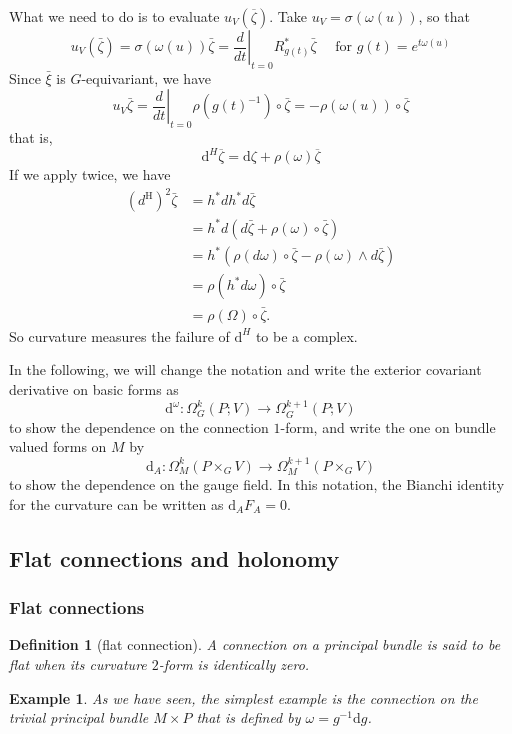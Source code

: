 \documentclass[11pt]{amsart}
\numberwithin{equation}{section}
\theoremstyle{plain}
\theoremstyle{plain}
\newtheorem{defnsub}[thmsub]{Definition}
\newtheorem{exsub}[thmsub]{Example}
\numberwithin{equation}{section}
\begin{document}
What we need to do is to evaluate $u_V(\overline{\zeta})$. Take $u_V=\sigma(\omega(u))$, so that 
$$
u_V(\bar{\zeta})=\sigma(\omega(u))\bar{\zeta}=\left.\frac{d}{d t}\right|_{t=0} R_{g(t)}^{*} \bar{\zeta} \quad \text { for } g(t)=e^{t \omega(u)}
$$
Since $\bar{\xi}$ is $G$-equivariant, we have
$$
u_{V} \bar{\zeta}=\left.\frac{d}{d t}\right|_{t=0} \rho\left(g(t)^{-1}\right) \circ \bar{\zeta}=-\rho(\omega(u)) \circ \bar{\zeta}
$$
that is,
$$
\mathrm{d}^H\overline{\zeta}=\mathrm{d}\zeta+\rho(\omega)\overline{\zeta}
$$
If we apply twice, we have 
$$
\begin{aligned}
\left(d^{\mathrm{H}}\right)^{2} \bar{\zeta} &=h^{*} d h^{*} d \bar{\zeta} \\
&=h^{*} d(d \bar{\zeta}+\rho(\omega) \circ \bar{\zeta}) \\
&=h^{*}(\rho(d \omega) \circ \bar{\zeta}-\rho(\omega) \wedge d \bar{\zeta}) \\
&=\rho\left(h^{*} d \omega\right) \circ \bar{\zeta} \\
&=\rho(\Omega) \circ \bar{\zeta} .
\end{aligned}
$$
So curvature measures the failure of $\mathrm{d}^H$ to be a complex.

In the following, we will change the notation and write the exterior covariant derivative on basic forms as
$$
\mathrm{d}^{\omega}:\Omega^k_G(P;V)\to\Omega^{k+1}_G(P;V)
$$
to show the dependence on the connection $1$-form, and write the one on bundle valued forms on $M$ by 
$$
\mathrm{d}_A:\Omega^k_M(P\times_GV)\to\Omega^{k+1}_M(P\times_GV)
$$
to show the dependence on the gauge field. In this notation, the Bianchi identity for the curvature can be written as $\mathrm{d}_AF_A=0$.

\subsection{Flat connections and holonomy}
\subsubsection{Flat connections}
\begin{defnsub}[flat connection]
A connection on a principal bundle is said to be flat when its curvature $2$-form is identically zero.
\end{defnsub}
\begin{exsub}\normalfont
As we have seen, the simplest example is the connection on the trivial principal bundle $M\times P$ that is defined by $\omega=g^{-1}\mathrm{d}g$.
\end{exsub}
\end{document}
